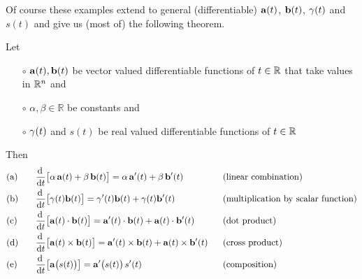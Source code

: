 Of course these examples extend to general (differentiable)
$\mathbf{a}(t)$, $\mathbf{b}(t)$, $\gamma(t)$ and $s(t)$ and give us (most of) the following theorem. 

\begin{theorem}\label{thm:DIFFalgebra}
Let 
\begin{itemize}\itemsep1pt \parskip0pt  %
\item[$\circ$]
$\mathbf{a}(t),\mathbf{b}(t)$ be vector valued differentiable functions of $t\in\mathbb{R}$
that take values in $\mathbb{R}^n$ and
\item[$\circ$]
 $\alpha,\beta \in \mathbb{R}$ be constants and 
\item[$\circ$]
 $\gamma(t)$ and $s(t)$ be real valued differentiable functions of $t\in\mathbb{R}$
\end{itemize}
Then
\begin{alignat*}{5}
&\text{(a)}\quad &&\diff{}{t}\big[\alpha\,\va(t)+\beta\,\vb(t)\big]
         =\alpha\,\va'(t)+\beta\,\vb'(t)
           &&\text{(linear combination)}
\\
&\text{(b)} &&\diff{}{t}\big[\ga(t)\vb(t)\big]
         =\ga'(t)\vb(t)+\ga(t)\vb'(t)
           &&\text{(multiplication by scalar function)}
\\
&\text{(c)} &&\diff{}{t}\big[\va(t)\cdot\vb(t)\big]
         =\va'(t)\cdot\vb(t)+\va(t)\cdot\vb'(t)
           &&\text{(dot product)}
\\
&\text{(d)} &&\diff{}{t}\big[\va(t)\times\vb(t)\big]
         =\va'(t)\times\vb(t)+\va(t)\times\vb'(t)
           \ \ &&\text{(cross product)}
\\
&\text{(e)} &&\diff{}{t}\big[\va\big(s(t)\big)\big]
         =\va'\big(s(t)\big)\,s'(t)
           &&\text{(composition)}
\end{alignat*}
\end{theorem}

